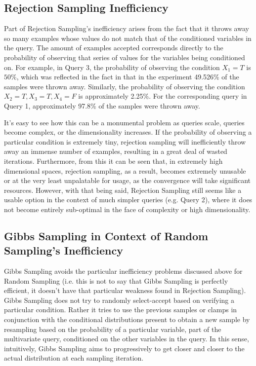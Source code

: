 \documentclass{article} %
\begin{document}
\subsection{Rejection Sampling Inefficiency}

Part of Rejection Sampling's inefficiency arises from the fact that it throws away so many examples whose values do not match that of the conditioned variables in the query. The amount of examples accepted corresponds directly to the probability of observing that series of values for the variables being conditioned on. For example, in Query 3, the probability of observing the condition \(X_1 = T\) is \(50\%\), which was reflected in the fact in that in the experiment 49.526\% of the samples were thrown away. Similarly, the probability of observing the condition \(X_2=T, X_3=T, X_4=F\) is approximately 2.25\%. For the corresponding query in Query 1, approximately 97.8\% of the samples were thrown away. 

It's easy to see how this can be a monumental problem as queries scale, queries become complex, or the dimensionality increases. If the probability of observing a particular condition is extremely tiny, rejection sampling will inefficiently throw away an immense number of examples, resulting in a great deal of wasted iterations. Furthermore, from this it can be seen that, in extremely high dimensional spaces, rejection sampling, as a result, becomes extremely unusable or at the very least unpalatable for usage, as the convergence will take significant resources. However, with that being said, Rejection Sampling still seems like a usable option in the context of much simpler queries (e.g. Query 2), where it does not become entirely sub-optimal in the face of complexity or high dimensionality. 

\subsection{Gibbs Sampling in Context of Random Sampling's Inefficiency}

Gibbs Sampling avoids the particular inefficiency problems discussed above for Random Sampling (i.e. this is not to say that Gibbs Sampling is perfectly efficient, it doesn't have that particular weakness found in Rejection Sampling). Gibbs Sampling does not try to randomly select-accept based on verifying a particular condition. Rather it tries to use the previous samples or clamps in conjunction with the conditional distributions present to obtain a new sample by resampling based on the probability of a particular variable, part of the multivariate query, conditioned on the other variables in the query. In this sense, intuitively, Gibbs Sampling aims to progressively to get closer and closer to the actual distribution at each sampling iteration.
\end{document}
